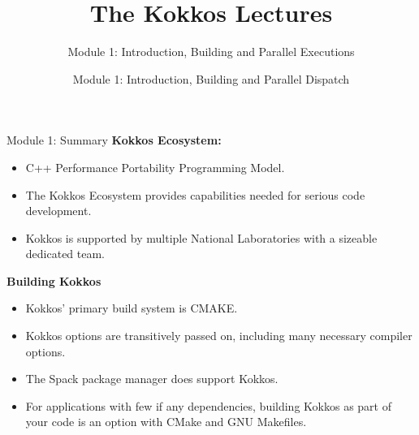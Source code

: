 

\def\sandid{SAND2020-7263 PE}

\title{The Kokkos Lectures}
\subtitle{Module 1: Introduction, Building and Parallel Executions}

\author{Module 1: Introduction, Building and Parallel Dispatch}



\shortfalse
\mediumtrue
\fulltrue
\notoverviewtrue



% 

\begin{frame}
	\titlepage
\end{frame}













\begin{frame}{Module 1: Summary}
	\textbf{Kokkos Ecosystem:}
	\begin{itemize}
		\item C++ Performance Portability Programming Model.
		\item The Kokkos Ecosystem provides capabilities needed for serious code development.
		\item Kokkos is supported by multiple National Laboratories with a sizeable dedicated team.
	\end{itemize}

	\textbf{Building Kokkos}
	\begin{itemize}
    \item{Kokkos' primary build system is CMAKE.}
    \item{Kokkos options are transitively passed on, including many necessary compiler options.}
    \item{The Spack package manager does support Kokkos.}
    \item{For applications with few if any dependencies, building Kokkos as part of your code is an option with CMake and GNU Makefiles.}
	\end{itemize}
\end{frame}

